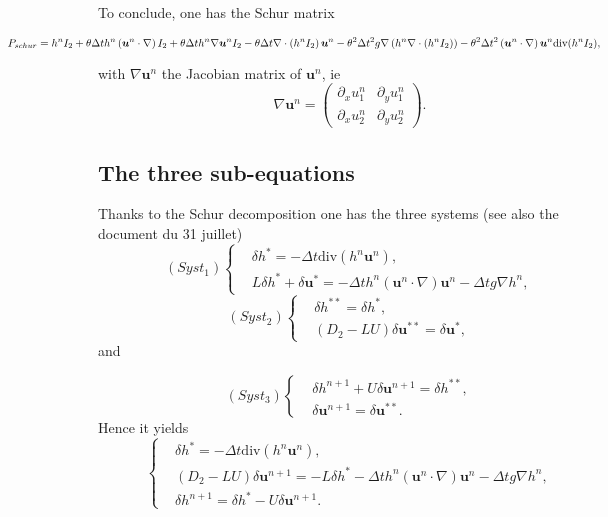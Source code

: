\documentclass[a4paper, 11pt]{article}
\begin{document}
To conclude, one has the Schur matrix 
\begin{small}
\begin{equation*}
\hspace*{-3cm}P_{schur}=h^nI_2+\theta\Delta th^n\left(\boldsymbol{u}^n\cdot\nabla\right)I_2+\theta\Delta th^n\nabla\boldsymbol{u}^nI_2-\theta\Delta t\nabla\cdot\left(h^nI_2\right)\boldsymbol{u}^n-\theta^2\Delta t^2g\nabla\left(h^n\nabla\cdot\left(h^nI_2\right)\right)-\theta^2\Delta t^2\left(\boldsymbol{u}^n\cdot\nabla\right)\boldsymbol{u}^n\text{div}(h^nI_2),
\end{equation*}
\end{small}
with $\nabla\boldsymbol{u}^n$ the Jacobian matrix of $\boldsymbol{u}^n$, ie
\begin{equation*}
\nabla\boldsymbol{u}^n=
\begin{pmatrix}
\partial_x u_1^n &\partial_y u_1^n\\ \partial_x u_2^n &\partial_y u_2^n
\end{pmatrix}.
\end{equation*}

\subsection{The three sub-equations}
Thanks to the Schur decomposition one has the three systems (see also the document du 31 juillet)
\begin{equation*}
(Syst_1)\left\{\begin{split}
&\delta h^*=-\Delta t\text{div}(h^n\boldsymbol{u}^n),\\
&L\delta h^*+\delta \boldsymbol{u}^*=-\Delta th^n\left(\boldsymbol{u}^n\cdot\nabla\right)\boldsymbol{u}^n-\Delta tg\nabla h^n,
\end{split}\right.
\end{equation*}
\begin{equation*}
(Syst_2)\left\{\begin{split}
&\delta h^{**}=\delta h^*,\\
&(D_2-LU)\delta \boldsymbol{u}^{**}=\delta \boldsymbol{u}^{*},
\end{split}
\right.
\end{equation*}
and

\begin{equation*}
(Syst_3)\left\{\begin{split}
&\delta h^{n+1}+U\delta \boldsymbol{u}^{n+1}=\delta h^{**},\\
&\delta \boldsymbol{u}^{n+1}=\delta \boldsymbol{u}^{**}.
\end{split}\right.
\end{equation*}
Hence it yields
\begin{equation*}
\left\{
\begin{split}
&\delta h^{*}=-\Delta t\text{div}(h^n\boldsymbol{u}^n),\\
&(D_2-LU)\delta \boldsymbol{u}^{n+1}=-L\delta h^*-\Delta th^n(\boldsymbol{u}^n\cdot\nabla)\boldsymbol{u}^n-\Delta tg\nabla h^n,\\
&\delta h^{n+1}=\delta h^*-U\delta \boldsymbol{u}^{n+1}.
\end{split}\right.
\end{equation*}
\end{document}
